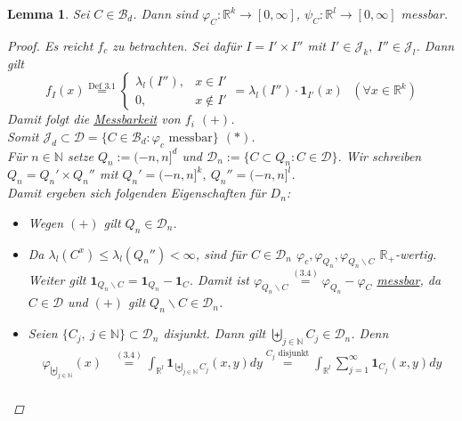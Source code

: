 \documentclass[a4paper]{scrreprt}
\newcommand{\doubleOne}{\textbf{1}}
\newcommand{\R}{\mathbb{R}}
\newcommand{\N}{\mathbb{N}}
\newcommand{\Borel}{\mathcal{B}}
\newcommand{\Bd}{\Borel_d}
\newcommand{\Jd}{\mathcal{J}_d}
\newcommand{\bigdcup}{\biguplus}
\newcommand{\jlabel}[1]{\label{j_#1}}
\newcommand{\jshortlink}[1]{\jhyperref{#1}{\text{#1}}}
\newcommand{\jhyperref}[2]{\hyperref[j_#1]{#2}}
\newcommand{\jlink}[1]{\jhyperref{#1}{#1}}
\newcommand{\jabb}[3]{ #1: #2 \rightarrow #3 }
\theoremstyle{plain}
\newtheorem{lem}[thm]{Lemma}
\theoremstyle{definition}
\begin{document}
{{{{\begin{lem}
\jlabel{Lem 3.19}
    Sei $C\in\Bd$. Dann sind $\jabb{\varphi_C}{\R^k}{[0,\infty]}$, $\jabb{\psi_C}{\R^l}{[0,\infty]}$ messbar.
    \begin{proof}
        Es reicht $f_c$ zu betrachten. Sei dafür $I = I'\times I''$ mit $I'\in \mathcal{J}_k,\ I''\in \mathcal{J}_l$. Dann gilt
        \begin{displaymath}
            f_I(x) \overset{\jshortlink{Def 3.1}}{=} \begin{cases} \lambda_l(I''), & x\in I' \\ 0, &x\notin I'  \end{cases} = \lambda_l(I'')\cdot \doubleOne_{I'}(x) \ \ \ (\forall x\in \R^k)
        \end{displaymath}
        Damit folgt die \hyperref[j_messbar]{Messbarkeit} von $f_i$ $(+)$.\\
        Somit $\Jd \subset \mathcal{D} = \{C\in \Bd : \varphi_c \text{ messbar}\}$ $(*)$.\\
        Für $n\in\N$ setze $Q_n := (-n,n]^d$ und $\mathcal{D}_n := \{C \subset Q_n : C \in \mathcal{D}\}$. Wir schreiben $Q_n = Q_n' \times Q_n''$ mit $Q_n' = (-n,n]^k, \ Q_n'' = (-n,n]^l$.\\
        Damit ergeben sich folgenden Eigenschaften für $D_n$:
        \begin{itemize}
            \item[(A1)] Wegen $(+)$ gilt $Q_n \in \mathcal{D}_n$.
            \item[(A2)] 
                Da $\lambda_l(C^x) \le \lambda_l(Q_n'') < \infty$, sind für $C\in \mathcal{D}_n$ $\varphi_c,\varphi_{Q_n},\varphi_{Q_n\backslash C}$ $\R_+$-wertig.\\
                Weiter gilt $\doubleOne_{Q_n\backslash C} = \doubleOne_{Q_n} - \doubleOne_C$. Damit ist $\varphi_{Q_n\backslash C} \overset{\jlink{(3.4)}}{=} \varphi_{Q_n} - \varphi_C$ \jlink{messbar}, da $C\in \mathcal{D}$ und $(+)$ gilt $Q_n \backslash C \in \mathcal{D}_n$.
            \item[(A3')]
                Seien $\{C_j,\ j\in \N\} \subset\mathcal{D}_n$ disjunkt. Dann gilt $\bigdcup_{j\in \N}C_j \in \mathcal{D}_n$. Denn
                \begin{displaymath}
                    \begin{split}
                        \varphi_{\bigdcup_{j\in\N}}(x) &\overset{\jlink{(3.4)}}{=} \int_{\R^l} \doubleOne_{\bigdcup_{j\in\N}C_j}(x,y)dy \overset{C_j\text{ disjunkt}}{=} \int_{\R^l}\sum_{j=1}^\infty \doubleOne_{C_j}(x,y) dy \\

\end{split}
\end{displaymath}
\end{itemize}
\end{proof}
\end{lem}}}}}
\end{document}
